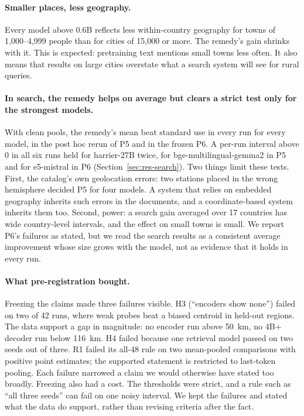 \paragraph{Smaller places, less geography.}
Every model above 0.6B reflects less within-country geography for towns of 1,000--4,999 people than for cities of 15,000 or more. The remedy's gain shrinks with it. This is expected: pretraining text mentions small towns less often. It also means that results on large cities overstate what a search system will see for rural queries.

\paragraph{In search, the remedy helps on average but clears a strict test only for the strongest models.}
With clean pools, the remedy's mean beat standard use in every run for every model, in the post hoc rerun of P5 and in the frozen P6. A per-run interval above 0 in all six runs held for harrier-27B twice, for bge-multilingual-gemma2 in P5 and for e5-mistral in P6 (Section~\ref{sec:res-search}). Two things limit these tests. First, the catalog's own geolocation errors: two stations placed in the wrong hemisphere decided P5 for four models. A system that relies on embedded geography inherits such errors in the documents, and a coordinate-based system inherits them too. Second, power: a search gain averaged over 17 countries has wide country-level intervals, and the effect on small towns is small. We report P6's failures as stated, but we read the search results as a consistent average improvement whose size grows with the model, not as evidence that it holds in every run.

\paragraph{What pre-registration bought.}
Freezing the claims made three failures visible. H3 (``encoders show none'') failed on two of 42 runs, where weak probes beat a biased centroid in held-out regions. The data support a gap in magnitude: no encoder run above 50~km, no 4B+ decoder run below 116~km. H4 failed because one retrieval model passed on two seeds out of three. R1 failed its all-48 rule on two mean-pooled comparisons with positive point estimates; the supported statement is restricted to last-token pooling. Each failure narrowed a claim we would otherwise have stated too broadly. Freezing also had a cost. The thresholds were strict, and a rule such as ``all three seeds'' can fail on one noisy interval. We kept the failures and stated what the data do support, rather than revising criteria after the fact.

